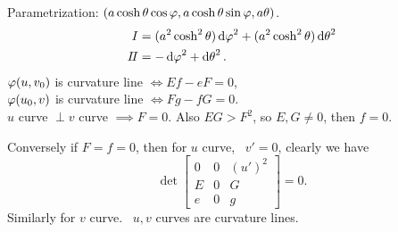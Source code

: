 \begin{example}[Catenoid]
    Parametrization: \((a\cosh\theta\cos\varphi,a\cosh\theta\sin\varphi,a\theta)\).\\
    \begin{align*}
        I&=(a^2\cosh^2\theta)\dd{\varphi}^2+(a^2\cosh^2\theta)\dd{\theta}^2 \\
        I\!I&=-\dd{\varphi}^2+\dd{\theta}^2
    .\end{align*}
    \(\varphi(u,v_0)\) is curvature line \(\iff Ef-eF=0\), \\
    \(\varphi(u_0,v)\) is curvature line \(\iff Fg-fG=0\). \\
    \(u\) curve \(\perp v\) curve \(\implies F=0\). Also \(EG>F^2\), so \(E,G\neq 
    0\), then \(f=0\).

    Conversely if \(F=f=0\), then for \(u\) curve, \ie\ \(v'= 0\),
    clearly we have \[
        \det\begin{bmatrix}
            0 & 0 & (u')^2 \\
            E & 0 & G \\
            e & 0 & g
        \end{bmatrix}=0
    .\] Similarly for \(v\) curve. \ie\ \(u,v\) curves are curvature lines.
\end{example}

